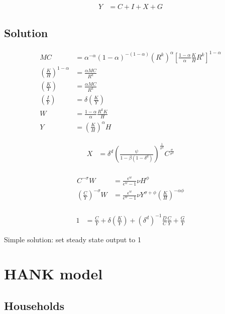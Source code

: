 \documentclass[11pt]{article}
\begin{document}
\begin{align*}
	Y &= C + I + X + G
\end{align*}


\subsection{Solution}

\begin{align*}
	MC &=\alpha^{-\alpha} (1-\alpha)^{-(1-\alpha)} (R^k)^{\alpha}[\frac{1-\alpha}{\alpha}\frac{K}{H} R^k]^{1-\alpha} \\
	\left(\frac{K}{H}\right)^{1-\alpha}&=\frac{\alpha MC}{R^k} \\
	\left(\frac{K}{Y}\right) &=\frac{\alpha MC}{R^k} \\
	\left(\frac{I}{Y}\right) &= \delta \left(\frac{K}{Y}\right) \\
	W&= \frac{1-\alpha}{\alpha}\frac{R^k K}{H} \\
	Y&=\left(\frac{K}{H}\right)^{\alpha}H
\end{align*}

\begin{align*}
	 X  & =\delta^d\left(\frac{\psi }{1-\beta(1-\delta^d)}\right)^{\frac{1}{\sigma^d}} C^{\frac{\sigma}{\sigma^d}} \\
\end{align*}

\begin{align*}
	C^{-\sigma} W&=\frac{\epsilon^w}{\epsilon^w-1}\nu H^{\phi} \\
	\left(\frac{C}{Y}\right)^{-\sigma} W &=\frac{\epsilon^w}{\epsilon^w-1}\nu Y^{\sigma + \phi}\left(\frac{K}{H}\right)^{-\alpha\phi} \\
\end{align*}


\begin{align*}
	1 &= \frac{C}{Y} + \delta \left(\frac{K}{Y}\right) + (\delta^d)^{-1}\frac{D}{C}\frac{C}{Y} + \frac{G}{Y}
\end{align*}

Simple solution: set steady state output to 1


\section{HANK model}

\subsection{Households}
\end{document}
